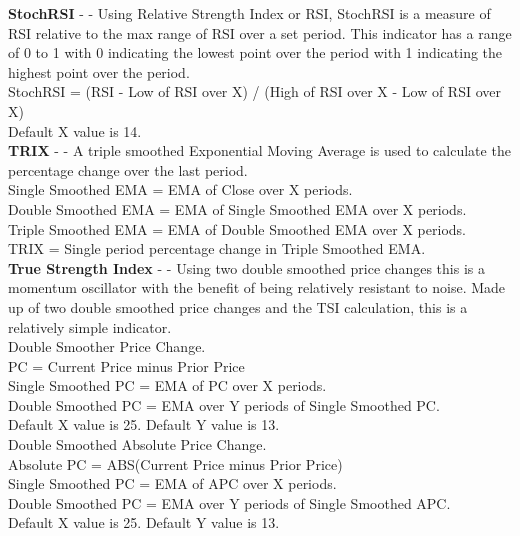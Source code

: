 \documentclass[conference]{IEEEtran}
\begin{document}

\noindent
\textbf{StochRSI} - \cite{Chande1994} - Using Relative Strength Index or RSI, StochRSI is a measure of RSI relative to the max range of RSI over a set period. This indicator has a range of 0 to 1 with 0 indicating the lowest point over the period with 1 indicating the highest point over the period.\\

\noindent
StochRSI = (RSI - Low of RSI over X) / (High of RSI over X - Low of RSI over X)\\
Default X value is 14.\\

\noindent
\textbf{TRIX} - \cite{Hutson1983} - A triple smoothed Exponential Moving Average is used to calculate the percentage change over the last period.\\

\noindent
Single Smoothed EMA = EMA of Close over X periods.\\
Double Smoothed EMA = EMA of Single Smoothed EMA over X periods.\\
Triple Smoothed EMA = EMA of Double Smoothed EMA over X periods.\\
TRIX = Single period percentage change in Triple Smoothed EMA. \\

\noindent
\textbf{True Strength Index} - \cite{Blau1995} - Using two double smoothed price changes this is a momentum oscillator with the benefit of being relatively resistant to noise. Made up of two double smoothed price changes and the TSI calculation, this is a relatively simple indicator.\\

\noindent
Double Smoother Price Change.\\
PC = Current Price minus Prior Price\\
Single Smoothed PC = EMA of PC over X periods.\\
Double Smoothed PC = EMA over Y periods of Single Smoothed PC.\\
Default X value is 25. Default Y value is 13.\\

\noindent
Double Smoothed Absolute Price Change. \\
Absolute PC = ABS(Current Price minus Prior Price)\\
Single Smoothed PC = EMA of APC over X periods.\\
Double Smoothed PC = EMA over Y periods of Single Smoothed APC.\\
Default X value is 25. Default Y value is 13.\\
\end{document}
